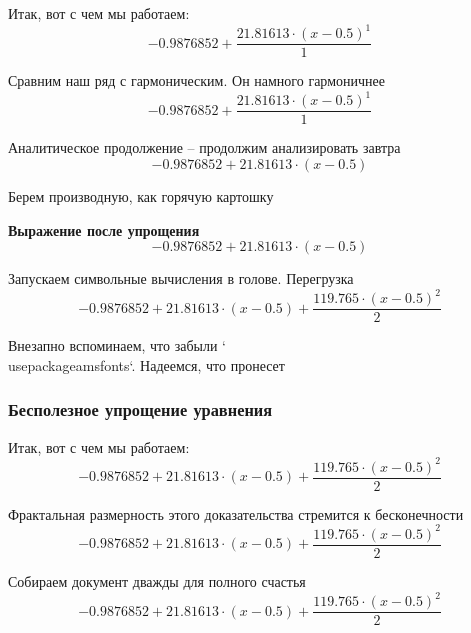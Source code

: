 \documentclass{article}
\begin{document}
Итак, вот с чем мы работаем:\\
\begin{dmath*}
-0.9876852 + \frac{21.81613 \cdot (x - 0.5)^{1}}{1}
\end{dmath*}


Сравним наш ряд с гармоническим. Он намного гармоничнее 
\begin{dmath*}
-0.9876852 + \frac{21.81613 \cdot (x - 0.5)^{1}}{1}
\end{dmath*}


Аналитическое продолжение – продолжим анализировать завтра 
\begin{dmath*}
-0.9876852 + 21.81613 \cdot (x - 0.5)
\end{dmath*}


Берем производную, как горячую картошку 

\noindent\textbf{Выражение после упрощения}\\[4pt]
\begin{dmath*}
-0.9876852 + 21.81613 \cdot (x - 0.5)
\end{dmath*}


Запускаем символьные вычисления в голове. Перегрузка 
\begin{dmath*}
-0.9876852 + 21.81613 \cdot (x - 0.5) + \frac{119.765 \cdot (x - 0.5)^{2}}{2}
\end{dmath*}


Внезапно вспоминаем, что забыли `\\usepackage{amsfonts}`. Надеемся, что пронесет 
\subsubsection*{Бесполезное упрощение уравнения}

Итак, вот с чем мы работаем:\\
\begin{dmath*}
-0.9876852 + 21.81613 \cdot (x - 0.5) + \frac{119.765 \cdot (x - 0.5)^{2}}{2}
\end{dmath*}


Фрактальная размерность этого доказательства стремится к бесконечности 
\begin{dmath*}
-0.9876852 + 21.81613 \cdot (x - 0.5) + \frac{119.765 \cdot (x - 0.5)^{2}}{2}
\end{dmath*}


Собираем документ дважды для полного счастья 
\begin{dmath*}
-0.9876852 + 21.81613 \cdot (x - 0.5) + \frac{119.765 \cdot (x - 0.5)^{2}}{2}
\end{dmath*}
\end{document}
